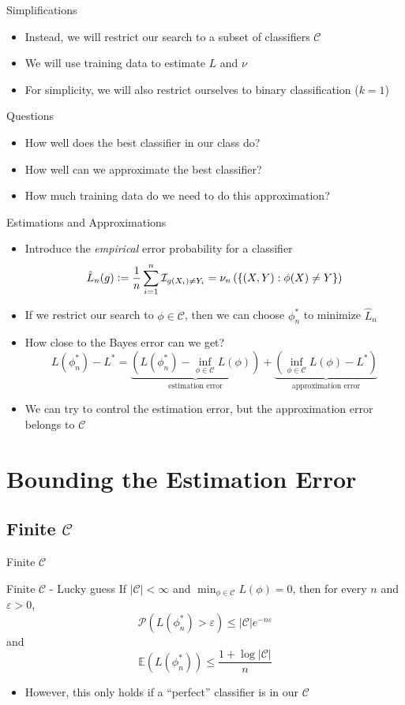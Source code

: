 \documentclass{beamer}
\renewcommand{\Pr}[1]{\mathcal{P} \left( #1 \right)}
\newcommand{\cls}{\mathcal{C}}
\newcommand{\E}[1]{\mathbb{E}\left( #1 \right)}
\newcommand{\defeq}{\vcentcolon=}
\newcommand{\pa}[1]{\left( #1 \right)}
\newcommand{\I}{\mathcal{I}}
\newcommand{\abs}[1]{\left| #1 \right|}
\newcommand{\br}[1]{\left\{ #1 \right\} }
\newcommand{\eps}{\varepsilon}
\begin{document}
\begin{frame}{Simplifications}
\begin{itemize}
\item Instead, we will restrict our search to a subset of classifiers $\cls$
\item We will use training data to estimate $L$ and $\nu$
\item For simplicity, we will also restrict ourselves to binary classification ($k=1$)
\end{itemize}
\end{frame}

\begin{frame}{Questions}
\begin{itemize}
\item How well does the best classifier in our class do?
\item How well can we approximate the best classifier?
\item How much training data do we need to do this approximation?
\end{itemize}
\end{frame}

\begin{frame}{Estimations and Approximations}
\begin{itemize}
\item Introduce the \emph{empirical} error probability for a classifier
\[ \hat{L}_n(g) \defeq \frac1n \sum_{i=1}^n \I_{g(X_i) \ne Y_i} = \nu_n\pa{\br{(X,Y) : \phi(X) \ne Y}}\]
\item If we restrict our search to $\phi \in \cls$, then we can choose $\phi_n^*$ to minimize $\hat{L}_n$
\item How close to the Bayes error can we get?
\[ L(\phi_n^*) - L^* = \underbrace{\pa{ L(\phi_n^*) - \inf_{\phi \in \cls} L(\phi)}}_{\text{estimation error}} + \underbrace{\pa{ \inf_{\phi \in \cls} L(\phi) - L^*}}_{\text{approximation error}} \]
\item We can try to control the estimation error, but the approximation error belongs to $\cls$
\end{itemize}
\end{frame}

\section{Bounding the Estimation Error}
\subsection{Finite $\cls$}
\begin{frame}{Finite $\cls$}
\begin{block}{Finite $\cls$ - Lucky guess}
If $\abs{\cls} < \infty$ and $\min_{\phi \in \cls} L(\phi) = 0$, then for every $n$ and $\eps > 0$,
\[ \Pr{L(\phi^*_n) > \eps} \leq \abs{\cls} e^{-n\eps}\]
and
\[ \E{L(\phi^*_n)} \leq \frac{1 + \log\abs{\cls}}n \]
\end{block}
\begin{itemize}
\item However, this only holds if a ``perfect'' classifier is in our $\cls$
\end{itemize}
\end{frame}
\end{document}
